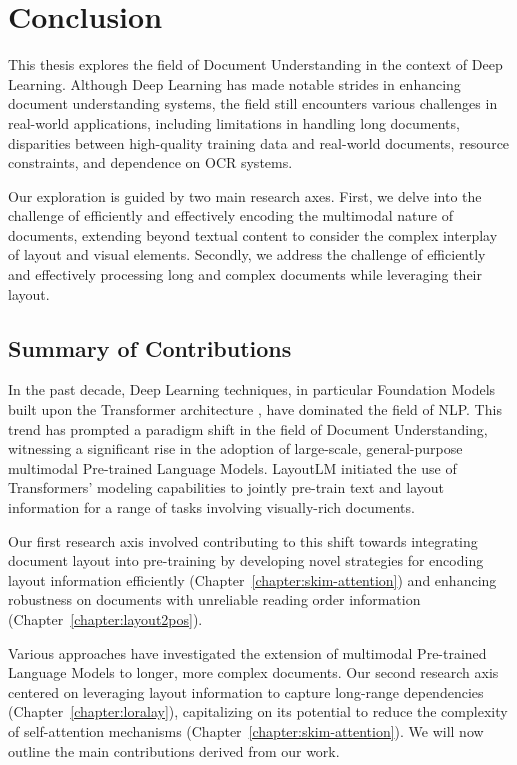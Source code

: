 
\chapter{Conclusion}
\label{chapter:conclusion}

\acresetall
{}


This thesis explores the field of Document Understanding in the context of Deep Learning. Although Deep Learning has made notable strides in enhancing document understanding systems, the field still encounters various challenges in real-world applications, including limitations in handling long documents, disparities between high-quality training data and real-world documents, resource constraints, and dependence on \ac{OCR} systems.

Our exploration is guided by two main research axes. First, we delve into the challenge of efficiently and effectively encoding the multimodal nature of documents, extending beyond textual content to consider the complex interplay of layout and visual elements. Secondly, we address the challenge of efficiently and effectively processing long and complex documents while leveraging their layout.

\section{Summary of Contributions}

In the past decade, Deep Learning techniques, in particular Foundation Models \citep{devlin2018bert, radford2019language, touvron2023llama} built upon the Transformer architecture \citep{vaswani2017attention}, have dominated the field of \ac{NLP}. This trend has prompted a paradigm shift in the field of Document Understanding, witnessing a significant rise in the adoption of large-scale, general-purpose multimodal Pre-trained Language Models. LayoutLM \citep{xu2020layoutlm} initiated the use of Transformers' modeling capabilities to jointly pre-train text and layout information for a range of tasks involving visually-rich documents. 

Our first research axis involved contributing to this shift towards integrating document layout into pre-training by developing novel strategies for encoding layout information efficiently (Chapter~\ref{chapter:skim-attention}) and enhancing robustness on documents with unreliable reading order information (Chapter~\ref{chapter:layout2pos}). 

Various approaches have investigated the extension of multimodal Pre-trained Language Models to longer, more complex documents. Our second research axis centered on leveraging layout information to capture long-range dependencies (Chapter~\ref{chapter:loralay}), capitalizing on its potential to reduce the complexity of self-attention mechanisms (Chapter~\ref{chapter:skim-attention}). We will now outline the main contributions derived from our work.

